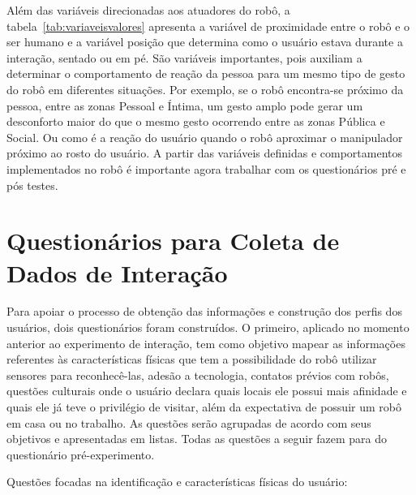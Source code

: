 Além das variáveis direcionadas aos atuadores do robô, a tabela~\ref{tab:variaveisvalores} apresenta a variável de proximidade entre o robô e o ser humano e a variável posição que determina como o usuário estava durante a interação, sentado ou em pé. São variáveis importantes, pois auxiliam a determinar o comportamento de reação da pessoa para um mesmo tipo de gesto do robô em diferentes situações. Por exemplo, se o robô encontra-se próximo da pessoa, entre as zonas Pessoal e Íntima, um gesto amplo pode gerar um desconforto maior do que o mesmo gesto ocorrendo entre as zonas Pública e Social. Ou como é a reação do usuário quando o robô aproximar o manipulador próximo ao rosto do usuário.  A partir das variáveis definidas e comportamentos implementados no robô é importante agora trabalhar com os questionários pré e pós testes.

\section{Questionários para Coleta de Dados de Interação}
\label{sec:questionarios}
Para apoiar o processo de obtenção das informações e construção dos perfis dos usuários, dois questionários foram construídos. O primeiro, aplicado no momento anterior ao experimento de interação, tem como objetivo mapear as informações referentes às características físicas que tem a possibilidade do robô utilizar sensores para reconhecê-las, adesão a tecnologia, contatos prévios com robôs, questões culturais onde o usuário declara quais locais ele possui mais afinidade e quais ele já teve o privilégio de visitar, além da expectativa de possuir um robô em casa ou no trabalho. As questões serão agrupadas de acordo com seus objetivos e apresentadas em listas. Todas as questões a seguir fazem para do questionário pré-experimento.

Questões focadas na identificação e características físicas do usuário:

